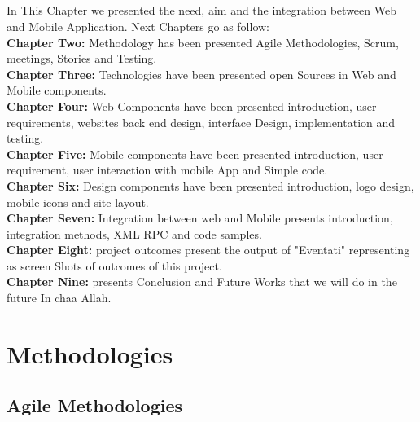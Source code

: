 \documentclass[12pt,a4paper,class,twoside,openany]{report}
\begin{document}
\paragraph*{\hspace{.9 cm} }In This Chapter we presented the need, aim and the integration between Web and Mobile Application. Next Chapters go as follow:
\\
\textbf{Chapter Two:} Methodology has been presented Agile Methodologies, Scrum, meetings, Stories and Testing.
\\
\textbf{Chapter Three:} Technologies have been presented open Sources in Web and Mobile components.
\\
\textbf{Chapter Four:} Web Components have been presented introduction, user requirements, websites back end design, interface Design, implementation and testing.
\\
\textbf{Chapter Five:} Mobile components have been presented introduction, user requirement, user interaction with mobile App and  Simple code.
\\
\textbf{Chapter Six:} Design components have been presented introduction, logo design, mobile icons and site layout.
\\
\textbf{Chapter Seven:} Integration between web and Mobile presents introduction, integration methods,  XML RPC and code samples.
\\
\textbf{Chapter Eight:} project outcomes present the output of "Eventati" representing as screen Shots of outcomes of this project.
\\
\textbf{Chapter Nine:} presents Conclusion and Future Works that we will do in the future In chaa Allah.
\cleardoublepage
\chapter{Methodologies}
\section{Agile Methodologies}
\end{document}

